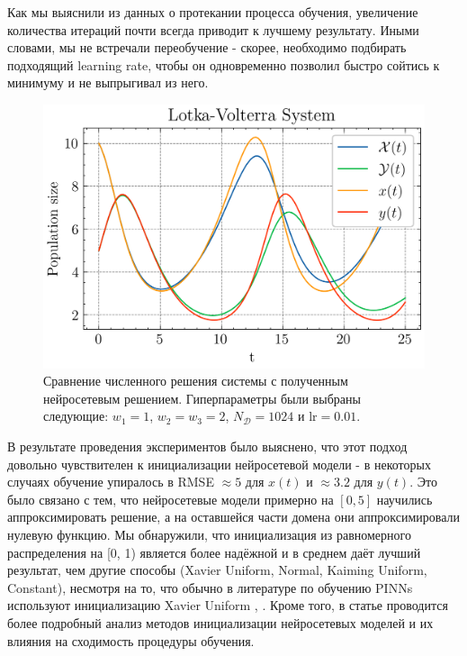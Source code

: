 \documentclass[a4paper, 12pt]{article}
\begin{document}
Как мы выяснили из данных о протекании процесса обучения, увеличение количества итераций почти всегда приводит к лучшему результату. Иными словами, мы не встречали переобучение - скорее, необходимо подбирать подходящий learning rate, чтобы он одновременно позволил быстро сойтись к минимуму и не выпрыгивал из него.

\begin{figure}
    \centering
    \includegraphics{../images/lotkavolterra/first approach/Lotka-Volterra System.png}
    \caption{Сравнение численного решения системы с полученным нейросетевым решением. Гиперпараметры были выбраны следующие: $w_1 = 1$, $w_2 = w_3 = 2$, $N_\mathcal{D} = 1024$ и $\mathrm{lr} = 0.01$.}
    \label{fig:lotkavolterra:first:solution}
\end{figure}

В результате проведения экспериментов было выяснено, что этот подход довольно чувствителен к инициализации нейросетевой модели - в некоторых случаях обучение упиралось в RMSE $\approx 5$ для $x(t)$ и $\approx 3.2$ для $y(t)$. Это было связано с тем, что нейросетевые модели примерно на $[0, 5]$ научились аппроксимировать решение, а на оставшейся части домена они аппроксимировали нулевую функцию. Мы обнаружили, что инициализация из равномерного распределения на [0, 1) является более надёжной и в среднем даёт лучший результат, чем другие способы (Xavier Uniform, Normal, Kaiming Uniform, Constant), несмотря на то, что обычно в литературе по обучению PINNs используют инициализацию Xavier Uniform \cite{rathore2024challenges}, \cite{wang2020pinns}. Кроме того, в статье \cite{Pang_2019} проводится более подробный анализ методов инициализации нейросетевых моделей и их влияния на сходимость процедуры обучения.
\end{document}
